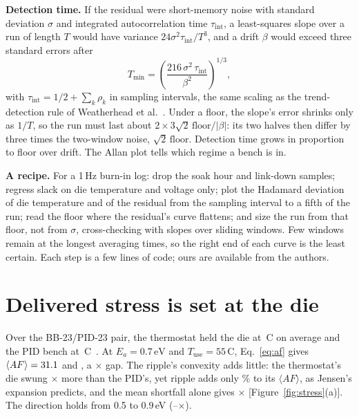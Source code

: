 \documentclass[10pt,twocolumn]{article}
\newcommand{\Tmin}{T_{\min}}
\newcommand{\tint}{\tau_{\mathrm{int}}}
\newcommand{\degC}{\,\textdegree C}
\newcommand{\unit}[1]{\,\mathrm{#1}}
\begin{document}
\textbf{Detection time.} If the residual were short-memory noise with standard deviation $\sigma$ and integrated autocorrelation time $\tint$, a least-squares slope over a run of length $T$ would have variance $24\sigma^2\tint/T^3$, and a drift $\beta$ would exceed three standard errors after
\begin{equation}
\Tmin=\left(\frac{216\,\sigma^2\,\tint}{\beta^2}\right)^{1/3},
\label{eq:tmin}
\end{equation}
with $\tint=1/2+\sum_k\rho_k$ in sampling intervals, the same scaling as the trend-detection rule of Weatherhead et al.~\cite{weatherhead}. Under a floor, the slope's error shrinks only as $1/T$, so the run must last about $2\times3\sqrt2\,\mathrm{floor}/|\beta|$: its two halves then differ by three times the two-window noise, $\sqrt2\,\mathrm{floor}$. Detection time grows in proportion to floor over drift. The Allan plot tells which regime a bench is in.

\textbf{A recipe.} For a 1\,Hz burn-in log: drop the soak hour and link-down samples; regress slack on die temperature and voltage only; plot the Hadamard deviation of die temperature and of the residual from the sampling interval to a fifth of the run; read the floor where the residual's curve flattens; and size the run from that floor, not from $\sigma$, cross-checking with slopes over sliding windows. Few windows remain at the longest averaging times, so the right end of each curve is the least certain. Each step is a few lines of code; ours are available from the authors.

\section{Delivered stress is set at the die}

Over the BB-23/PID-23 pair, the thermostat held the die at \vTBB\degC{} on average and the PID bench at \vTPID\degC~\cite{sbcci26}. At $E_a=0.7\unit{eV}$ and $T_{\mathrm{use}}=55$\degC, Eq.~\eqref{eq:af} gives $\langle AF\rangle=31.1$ and \vAFPID, a \vAFratio$\times$ gap. The ripple's convexity adds little: the thermostat's die swung \vTsdRatio$\times$ more than the PID's, yet ripple adds only \vRippleBB\% to its $\langle AF\rangle$, as Jensen's expansion predicts, and the mean shortfall alone gives \vAFratioMeanOnly$\times$ [Figure~\ref{fig:stress}(a)]. The direction holds from 0.5 to 0.9\,eV (\vAFratioLoOne--\vAFratioHiOne$\times$).
\end{document}
